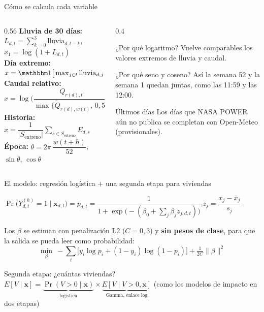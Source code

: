 \documentclass[aspectratio=169,11pt]{beamer}
\begin{document}
\begin{frame}{Cómo se calcula cada variable}
\begin{columns}[T]
\begin{column}{0.56\textwidth}\small
\textbf{Lluvia de 30 días:} $L_{d,t}=\sum_{k=0}^{3}\text{lluvia}_{d,t-k}$, \quad $x_1=\log(1+L_{d,t})$\\[4pt]
\textbf{Día extremo:} $x=\ind\big[\max_{j\in t}\text{lluvia}_{d,j} > P_{95}(d)\big]$\\[4pt]
\textbf{Caudal relativo:} $x=\log\Big(\dfrac{Q_{r(d),t}}{\max\{\tilde Q_{r(d),w(t)},\,0{,}5\}}\Big)$\\[4pt]
\textbf{Historia:} $x=\dfrac{1}{|S_{\text{entreno}}|}\sum_{s\in S_{\text{entreno}}}E_{d,s}$\\[4pt]
\textbf{Época:} $\theta=2\pi\,\dfrac{w(t+h)}{52}$, \quad $\sin\theta$, $\cos\theta$
\end{column}
\begin{column}{0.4\textwidth}
\begin{caja}{¿Por qué logaritmo?}
Vuelve comparables los valores extremos de lluvia y caudal.
\end{caja}
\begin{caja}{¿Por qué seno y coseno?}
Así la semana 52 y la semana 1 quedan juntas, como las 11:59 y las 12:00.
\end{caja}
\begin{caja}[naranja]{Últimos días}
Los días que NASA POWER aún no publica se completan con Open-Meteo (provisionales).
\end{caja}
\end{column}
\end{columns}
\end{frame}

\begin{frame}{El modelo: regresión logística + una segunda etapa para viviendas}
\begin{cajasin}\centering
$\Pr\big(Y^{(h)}_{d,t}=1\mid \mathbf{x}_{d,t}\big)=p_{d,t}=\dfrac{1}{1+\exp\!\big(-(\beta_0+\sum_j \beta_j z_{j,d,t})\big)}$,\qquad $z_j=\dfrac{x_j-\bar x_j}{s_j}$
\end{cajasin}
\small Los $\beta$ se estiman con penalización L2 ($C=0{,}3$) y \textbf{sin pesos de clase}, para que la salida se pueda leer como probabilidad:
\[\min_\beta\ -\sum_i\big[y_i\log p_i+(1-y_i)\log(1-p_i)\big]+\tfrac{1}{2C}\|\beta\|^2\]
\begin{caja}[verde]{Segunda etapa: ¿cuántas viviendas?}
$E[V\mid\mathbf{x}]=\underbrace{\Pr(V>0\mid\mathbf{x})}_{\text{logística}}\times\underbrace{E[V\mid V>0,\mathbf{x}]}_{\text{Gamma, enlace log}}$ \quad (como los modelos de impacto en dos etapas)
\end{caja}
\end{frame}
\end{document}
